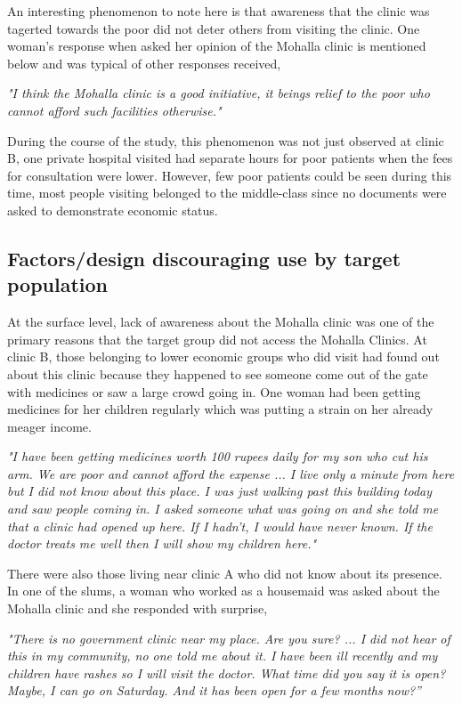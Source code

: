 An interesting phenomenon to note here is that awareness that the clinic was tagerted towards the poor did not deter others from visiting the clinic. One woman's response when asked her opinion of the Mohalla clinic is mentioned below and was typical of other responses received, 

\textit{"I think the Mohalla clinic is a good initiative, it beings relief to the poor who cannot afford such facilities otherwise."}

During the course of the study, this phenomenon was not just observed at clinic B, one private hospital visited had separate hours for poor patients when the fees for consultation were lower. However, few poor patients could be seen during this time, most people visiting belonged to the middle-class since no documents were asked to demonstrate economic status.

\subsection{Factors/design discouraging use by target population} %
At the surface level, lack of awareness about the Mohalla clinic was one of the primary reasons that the target group did not access the Mohalla Clinics. At clinic B, those belonging to lower economic groups who did visit had found out about this clinic because they happened to see someone come out of the gate with medicines or saw a large crowd going in. One woman had been getting medicines for her children regularly which was putting a strain on her already meager income. 

\textit{"I have been getting medicines worth 100 rupees daily for my son who cut his arm. We are poor and cannot afford the expense ... I live only a minute from here but I did not know about this place. I was just walking past this building today and saw people coming in. I asked someone what was going on and she told me that a clinic had opened up here. If I hadn't, I would have never known. If the doctor treats me well then I will show my children here."}

There were also those living near clinic A who did not know about its presence. In one of the slums, a woman who worked as a housemaid was asked about the Mohalla clinic and she responded with surprise,

\textit{"There is no government clinic near my place. Are you sure? ... I did not hear of this in my community, no one told me about it. I have been ill recently and my children have rashes so I will visit the doctor. What time did you say it is open? Maybe, I can go on Saturday. And it has been open for a few months now?”}

